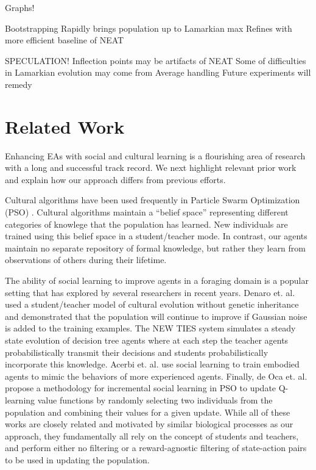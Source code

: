 \documentclass{acm_proc_article-sp}
\begin{document}
Graphs!

Bootstrapping
    Rapidly brings population up to Lamarkian max
    Refines with more efficient baseline of NEAT
    
SPECULATION!
    Inflection points may be artifacts of NEAT
    Some of difficulties in Lamarkian evolution may come from Average handling
    Future experiments will remedy

\section{Related Work}
\label{sec:related}
Enhancing EAs with social and cultural learning is a flourishing area of research with a long and successful track record.
We next highlight relevant prior work and explain how our approach differs from previous efforts.

Cultural algorithms \cite{reynolds1994introduction} have been used frequently in Particle Swarm Optimization (PSO) \cite{kennedy1995particle}. Cultural algorithms maintain a ``belief space'' representing different categories of knowlege that the population has learned. New individuals are trained using this belief space in a student/teacher mode. In contrast, our agents maintain no separate repository of formal knowledge, but rather they learn from observations of others during their lifetime.

The ability of social learning to improve agents in a foraging domain is a popular setting that has explored by several researchers in recent years. Denaro et. al. \cite{denaro1996cultural} used a student/teacher model of cultural evolution without genetic inheritance and demonstrated that the population will continue to improve if Gaussian noise is added to the training examples. The NEW TIES system \cite{haasdijk2008social, vogt2010modeling} simulates a steady state evolution of decision tree agents where at each step the teacher agents probabilistically transmit their decisions and students probabilistically incorporate this knowledge. Acerbi et. al. \cite{acerbi2007social} use social learning to train embodied agents to mimic the behaviors of more experienced agents. Finally, de Oca et. al. \cite{de2011incremental} propose a methodology for incremental social learning in PSO to update Q-learning \cite{watkins1992q} value functions by randomly selecting two individuals from the population and combining their values for a given update. While all of these works are closely related and motivated by similar biological processes as our approach, they fundamentally all rely on the concept of students and teachers, and perform either no filtering or a reward-agnostic filtering of state-action pairs to be used in updating the population.
\end{document}
